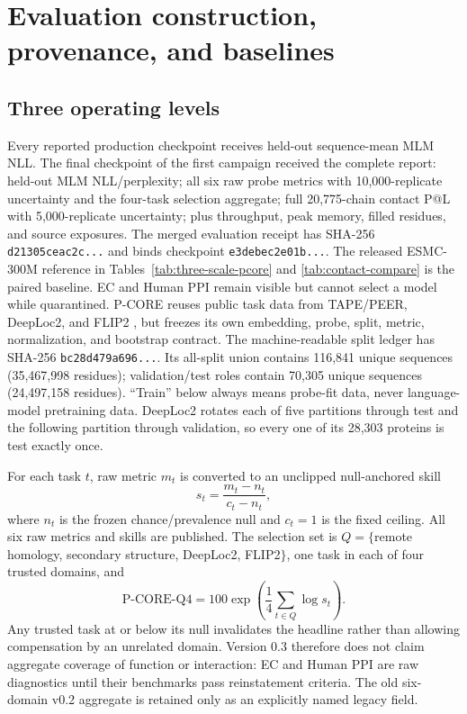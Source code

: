 \documentclass{article}
\newcommand{\code}[1]{\texttt{#1}}
\begin{document}
\section{Evaluation construction, provenance, and baselines}
\label{app:evaluation}

\subsection{Three operating levels}

Every reported production checkpoint receives held-out sequence-mean MLM NLL.
The final checkpoint of the first campaign
received the complete report: held-out MLM NLL/perplexity; all six raw probe
metrics with 10,000-replicate uncertainty and the four-task selection aggregate;
full 20,775-chain contact P@L with 5,000-replicate uncertainty; plus throughput,
peak memory, filled residues, and source exposures. The merged evaluation
receipt has SHA-256 \code{d21305ceac2c...} and binds checkpoint
\code{e3debec2e01b...}. The released
ESMC-300M reference in Tables~\ref{tab:three-scale-pcore} and
\ref{tab:contact-compare} is the paired baseline. EC and Human PPI remain
visible but cannot select a model while quarantined. P-CORE reuses public task data from
TAPE/PEER, DeepLoc2, and FLIP2
\citep{rao2019tape,xu2022peer,thumuluri2022deeploc2,didi2026flip2}, but freezes
its own embedding, probe, split, metric, normalization, and bootstrap contract.
The machine-readable split ledger has SHA-256
\code{bc28d479a696...}. Its all-split union contains 116,841 unique sequences
(35,467,998 residues); validation/test roles contain 70,305 unique sequences
(24,497,158 residues). ``Train'' below always means probe-fit data, never
language-model pretraining data. DeepLoc2 rotates each of five partitions
through test and the following partition through validation, so every one of
its 28,303 proteins is test exactly once.

For each task $t$, raw metric $m_t$ is converted to an unclipped null-anchored
skill
\[
  s_t = \frac{m_t-n_t}{c_t-n_t},
\]
where $n_t$ is the frozen chance/prevalence null and $c_t=1$ is the fixed
ceiling. All six raw metrics and skills are published. The selection set is
$Q=\{$remote homology, secondary structure, DeepLoc2, FLIP2$\}$, one task in
each of four trusted domains, and
\[
  \mathrm{P\mbox{-}CORE\mbox{-}Q4}
  =100\exp\!\left(\frac{1}{4}\sum_{t\in Q}\log s_t\right).
\]
Any trusted task at or below its null invalidates the headline rather than
allowing compensation by an unrelated domain. Version 0.3 therefore does not
claim aggregate coverage of function or interaction: EC and Human PPI are raw
diagnostics until their benchmarks pass reinstatement criteria. The old
six-domain v0.2 aggregate is retained only as an explicitly named legacy field.
\end{document}
